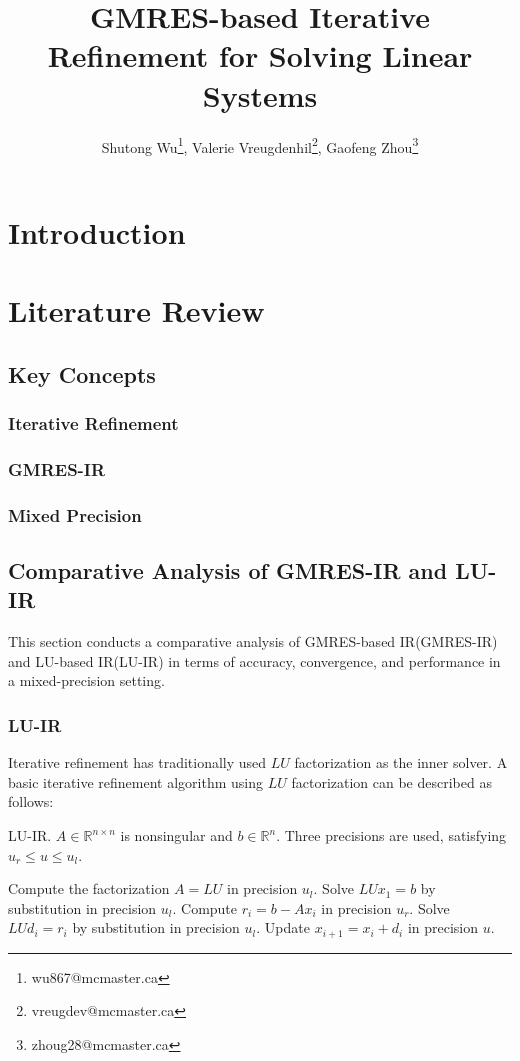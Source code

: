 \documentclass[12pt]{article}
\begin{document}
%
\title{GMRES-based Iterative Refinement for
Solving Linear Systems}


\author{Shutong Wu\thanks{wu867@mcmaster.ca}, Valerie Vreugdenhil\thanks{vreugdev@mcmaster.ca}, Gaofeng Zhou\thanks{zhoug28@mcmaster.ca}}
%
%
\maketitle             

%
\section{Introduction}

\section{Literature Review}

\subsection{Key Concepts}
\subsubsection{Iterative Refinement}
\subsubsection{GMRES-IR}
\subsubsection{Mixed Precision}

\subsection{Comparative Analysis of GMRES-IR and LU-IR}
This section conducts a comparative analysis of GMRES-based IR(GMRES-IR) and LU-based IR(LU-IR) in terms of accuracy, convergence, and performance in a mixed-precision setting.
\subsubsection{LU-IR}
Iterative refinement has traditionally used $LU$ factorization as the inner solver. A basic iterative refinement algorithm using $LU$ factorization can be described as follows:

\begin{algorithm}
    \caption{LU-IR. $A \in \mathbb{R}^{n \times n}$ is nonsingular and $b \in \mathbb{R}^n$. Three precisions are used, satisfying $u_r \leq u \leq u_l$.}
    \begin{algorithmic}[1]
        \State Compute the factorization $A = LU$ in precision $u_l$.
        \State Solve $LUx_1 = b$ by substitution in precision $u_l$.
            \State Compute $r_i = b - Ax_i$ in precision $u_r$.
            \State Solve $LUd_i = r_i$ by substitution in precision $u_l$.
            \State Update $x_{i+1} = x_i + d_i$ in precision $u$.
        \EndFor
    \end{algorithmic}
\end{algorithm}
\end{document}
